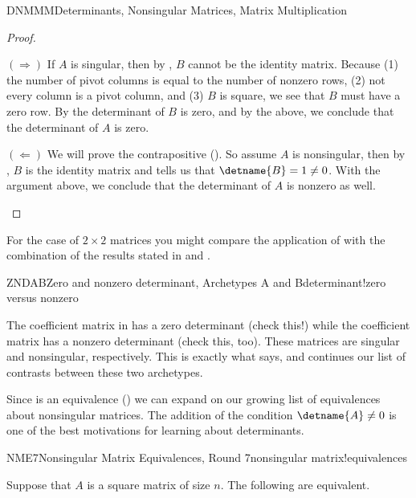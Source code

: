 \begin{subsect}{DNMMM}{Determinants, Nonsingular Matrices, Matrix Multiplication}
\begin{proof}
%
\begin{para}$(\Rightarrow)$\quad
If $A$ is singular, then by , $B$ cannot be the identity matrix.  Because (1) the number of pivot columns is equal to the number of nonzero rows, (2) not every column is a pivot column, and (3) $B$ is square, we see that $B$ must have a zero row.  By  the determinant of $B$ is zero, and by the above, we conclude that the determinant of $A$ is zero.\end{para}
%
\begin{para}$(\Leftarrow)$\quad
We will prove the contrapositive ().  So assume $A$ is nonsingular, then by  , $B$ is the identity matrix and  tells us that $\detname{B}=1\neq 0$.  With the argument above, we conclude that the determinant of $A$ is nonzero as well.\end{para}
%
\end{proof}
%
\begin{para}For the case of $2\times 2$ matrices you might compare the application of  with the combination of the results stated in  and .\end{para}
%
\begin{example}{ZNDAB}{Zero and nonzero determinant, Archetypes A and B}{determinant!zero versus nonzero}
\begin{para}The coefficient matrix in  has a zero determinant (check this!) while the coefficient matrix  has a nonzero determinant (check this, too).  These matrices are singular and nonsingular, respectively.  This is exactly what  says, and continues our list of contrasts between these two archetypes.\end{para}
\end{example}
%
\begin{para}Since  is an equivalence () we can expand on our growing list of equivalences about nonsingular matrices.  The addition of the condition $\detname{A}\neq 0$ is one of the best motivations for learning about determinants.\end{para}
%
\begin{theorem}{NME7}{Nonsingular Matrix Equivalences, Round 7}{nonsingular matrix!equivalences}
\begin{para}Suppose that $A$ is a square matrix of size $n$.  The following are equivalent.

\end{para}
\end{theorem}
\end{subsect}
